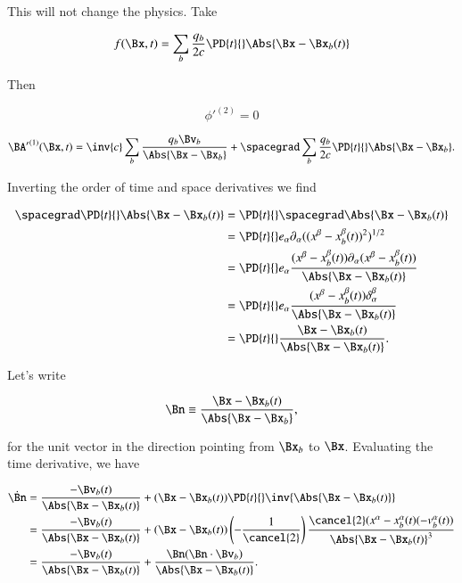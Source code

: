 This will not change the physics.  Take

\begin{equation}\label{eqn:relativisticElectrodynamicsL25:370}
f(\Bx, t) = \sum_b \frac{q_b}{2 c} \PD{t}{} \Abs{\Bx - \Bx_b(t)}
\end{equation}

Then 

\begin{equation}\label{eqn:relativisticElectrodynamicsL25:390}
{\phi'}^{(2)} = 0
\end{equation}

\begin{equation}\label{eqn:relativisticElectrodynamicsL25:410}
{\BA'}^{(1)}(\Bx, t) = \inv{c} \sum_b \frac{q_b \Bv_b}{\Abs{\Bx - \Bx_b}} + \spacegrad \sum_b \frac{q_b}{2 c} \PD{t}{} \Abs{\Bx - \Bx_b}.
\end{equation}

Inverting the order of time and space derivatives we find

\begin{align*}
\spacegrad \PD{t}{} \Abs{\Bx - \Bx_b(t)}
&=
\PD{t}{} \spacegrad \Abs{\Bx - \Bx_b(t)} \\
&=
\PD{t}{} e_\alpha \partial_\alpha ((x^\beta - x_b^\beta(t))^2)^{1/2}
 \\
&=
\PD{t}{} e_\alpha 
\frac{(x^\beta - x_b^\beta(t)) \partial_\alpha (x^\beta - x_b^\beta(t))}{\Abs{\Bx -\Bx_b(t)}}
 \\
&=
\PD{t}{} e_\alpha
\frac{(x^\beta - x_b^\beta(t)) \delta_\alpha^\beta}{\Abs{\Bx -\Bx_b(t)}}
 \\
&=
\PD{t}{} 
\frac{\Bx - \Bx_b(t)}{\Abs{\Bx -\Bx_b(t)}}.
\end{align*}

Let's write

\begin{equation}\label{eqn:relativisticElectrodynamicsL25:430}
\Bn \equiv \frac{\Bx - \Bx_b(t)}{\Abs{\Bx - \Bx_b}},
\end{equation}

for the unit vector in the direction pointing from $\Bx_b$ to $\Bx$.  Evaluating the time derivative, we have

\begin{align*}
\dot{\Bn} 
&= 
\frac{- \Bv_b(t)}{\Abs{\Bx -\Bx_b(t)}}
+(\Bx - \Bx_b(t)) \PD{t}{} \inv{\Abs{\Bx -\Bx_b(t)}} \\
&= 
\frac{- \Bv_b(t)}{\Abs{\Bx -\Bx_b(t)}}
+(\Bx - \Bx_b(t)) 
\left(
-\frac{1}{\cancel{2}} 
\right) \frac{ \cancel{2} (x^\alpha - x^\alpha_b(t) (-v^\alpha_b(t))}{\Abs{\Bx - \Bx_b(t)}^3} \\
&= 
\frac{- \Bv_b(t)}{\Abs{\Bx -\Bx_b(t)}}
+ \frac{\Bn (\Bn \cdot \Bv_b)}{\Abs{\Bx - \Bx_b(t)}}.
\end{align*}

